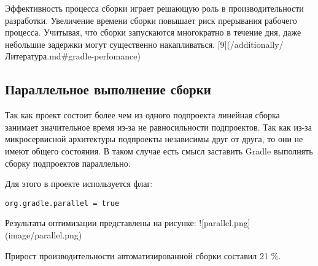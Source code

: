 Эффективность процесса сборки играет решающую роль в производительности разработки.
Увеличение
времени сборки повышает риск прерывания рабочего процесса.
Учитывая, что сборки запускаются
многократно в течение дня, даже небольшие задержки могут существенно
накапливаться.
[9](/additionally/Литература.md\#gradle-perfomance)

\subsection{Параллельное выполнение сборки}\label{subsec:--}

Так как проект состоит более чем из одного подпроекта линейная сборка занимает значительное время
из-за не равносильности подпроектов.
Так как из-за микросервисной архитектуры подпроекты независимы
друг от друга, то они не имеют общего состояния.
В таком случае есть смысл заставить Gradle
выполнять сборку подпроектов параллельно.

Для этого в проекте используется флаг:

\begin{lstlisting}[label={lst:lstlisting2}]
    org.gradle.parallel = true
\end{lstlisting}


Результаты оптимизации представлены на рисунке:
![parallel.png](image/parallel.png)

Прирост производительности автоматизированной сборки составил 21 \%.


